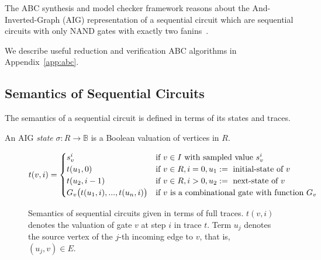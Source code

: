 The ABC synthesis and model checker framework reasons about 
the And-Inverted-Graph (AIG) representation of a sequential 
circuit which are sequential circuits with only NAND gates 
with exactly two fanins~\cite{brayton2010abc}. 

We describe useful reduction
and verification ABC algorithms in Appendix~\ref{app:abc}. 


\subsection{Semantics of Sequential Circuits}
\label{s:back:crct_semantics}
%
The semantics of a sequential circuit is defined in terms of its states and traces.
%
\begin{definition}
An AIG \emph{state} $\sigma: R \rightarrow \mathbb{B}$ is a Boolean valuation of vertices in $R$. 
\end{definition}
%


%
\begin{figure*}
\[
t(v,i)=
   \begin{cases}
      s^i_{v}            & \text{if } v \in I \ \text{with sampled value $s_{v}^i$}\\
      t(u_1, 0)       & \text{if } v \in R,i=0,u_1:=\ \text{initial-state of $v$}\\
      t(u_2, i-1)        & \text{if } v \in R,i>0,u_2:=\ \text{next-state of $v$}\\
      G_v\big(t(u_{1},i),...,t(u_{n},i)\big) & \text{if } v \ \text{is a combinational gate with function $G_v$}
   \end{cases} \newline
\]
\caption{Semantics of sequential circuits given in terms of 
  full traces. $t(v,i)$ denotes the valuation of gate $v$ at step $i$ in trace $t$.
Term $u_{j}$ denotes the source vertex of the $j$-th incoming edge to $v$, that is, %
$(u_{j},v)\in E$.
  }
\label{fig:gate-value}
\end{figure*}
%

